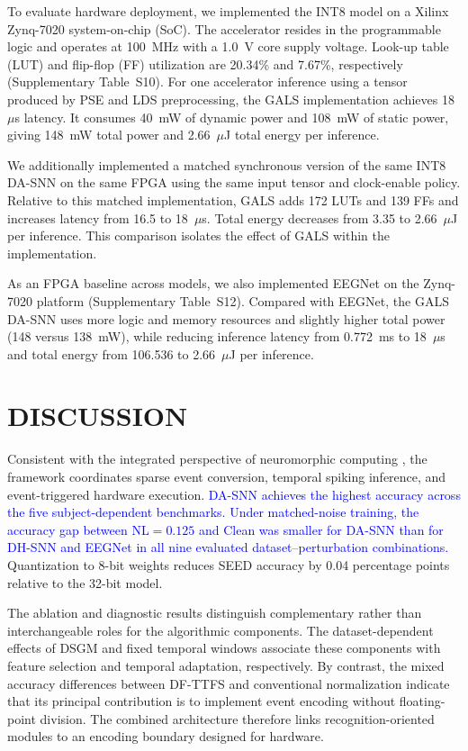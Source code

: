 \documentclass{nsr}
\newcommand{\Rtwoadd}[1]{\textcolor{blue}{#1}}
\begin{document}
To evaluate hardware deployment, we implemented the INT8 model on a Xilinx Zynq-7020 system-on-chip (SoC). The accelerator resides in the programmable logic and operates at 100~MHz with a 1.0~V core supply voltage. Look-up table (LUT) and flip-flop (FF) utilization are 20.34\% and 7.67\%, respectively (Supplementary Table~S10). For one accelerator inference using a tensor produced by PSE and LDS preprocessing, the GALS implementation achieves 18~$\mu$s latency. It consumes 40~mW of dynamic power and 108~mW of static power, giving 148~mW total power and 2.66~$\mu$J total energy per inference.

We additionally implemented a matched synchronous version of the same INT8 DA-SNN on the same FPGA using the same input tensor and clock-enable policy. Relative to this matched implementation, GALS adds 172 LUTs and 139 FFs and increases latency from 16.5 to 18~$\mu$s. Total energy decreases from 3.35 to 2.66~$\mu$J per inference. This comparison isolates the effect of GALS within the implementation.

As an FPGA baseline across models, we also implemented EEGNet on the Zynq-7020 platform (Supplementary Table~S12). Compared with EEGNet, the GALS DA-SNN uses more logic and memory resources and slightly higher total power (148 versus 138~mW), while reducing inference latency from 0.772~ms to 18~$\mu$s and total energy from 106.536 to 2.66~$\mu$J per inference.


\section{DISCUSSION}
Consistent with the integrated perspective of neuromorphic computing \cite{ref71}, the framework coordinates sparse event conversion, temporal spiking inference, and event-triggered hardware execution. \Rtwoadd{DA-SNN achieves the highest accuracy across the five subject-dependent benchmarks. Under matched-noise training, the accuracy gap between NL$=0.125$ and Clean was smaller for DA-SNN than for DH-SNN and EEGNet in all nine evaluated dataset--perturbation combinations.} Quantization to 8-bit weights reduces SEED accuracy by 0.04 percentage points relative to the 32-bit model.

The ablation and diagnostic results distinguish complementary rather than interchangeable roles for the algorithmic components. The dataset-dependent effects of DSGM and fixed temporal windows associate these components with feature selection and temporal adaptation, respectively. By contrast, the mixed accuracy differences between DF-TTFS and conventional normalization indicate that its principal contribution is to implement event encoding without floating-point division. The combined architecture therefore links recognition-oriented modules to an encoding boundary designed for hardware.
\end{document}
